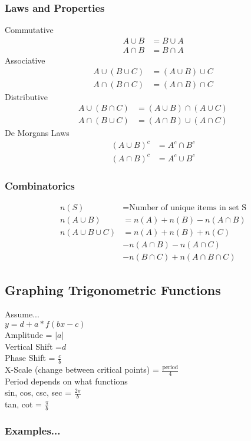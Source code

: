 \documentclass[]{article}
\begin{document}
	\subsubsection*{Laws and Properties}
	Commutative
	\begin{align*}
		A \cup B &= B \cup A \\
		A \cap B &= B \cap A
	\end{align*}
	Associative
	\begin{align*}
		A \cup (B \cup C) &= (A \cup B) \cup C \\
		A \cap (B \cap C) &= (A \cap B) \cap C
	\end{align*}
	Distributive
	\begin{align*}
		A \cup (B \cap C) &= (A \cup B) \cap (A \cup C) \\
		A \cap (B \cup C) &= (A \cap B) \cup (A \cap C)
	\end{align*}
	De Morgans Laws
	\begin{align*}
		(A \cup B)^c &= A^c \cap B^c \\
		(A \cap B)^c &= A^c \cup B^c
	\end{align*}
	
	\subsubsection*{Combinatorics}
	\begin{align*}
		n(S) &= \text{Number of unique items in set S} \\
		n(A \cup B) &= n(A) + n(B) - n(A \cap B) \\
		n(A \cup B \cup C) &=  n(A) + n(B) + n(C) \\
										 & - n(A \cap B) - n(A \cap C) \\
										 & - n(B \cap C) + n(A \cap B \cap C)
\end{align*}


	\subsection*{Graphing Trigonometric Functions}
	
	Assume... \\
	\indent $ y = d + a * f(bx - c) $ \\
	\indent Amplitude = $ \vert a \vert $ \\
	\indent Vertical Shift =$ d $ \\
	\indent Phase Shift = $ \frac{c}{b} $ \\
	\indent X-Scale (change between critical points) = $ \frac{\text{period}}{4} $ \\
	Period depends on what functions \\
	\indent sin, cos, csc, sec = $ \frac{2\pi}{b} $ \\
	\indent tan, cot = $ \frac{\pi}{b} $
	
	\subsubsection*{Examples...}
	
\end{document}
